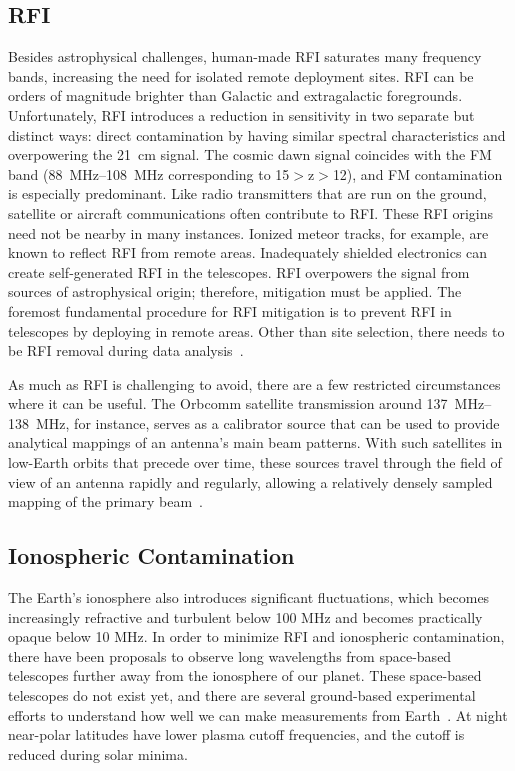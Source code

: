 \subsection*{RFI}

Besides astrophysical challenges, human-made RFI saturates many frequency bands, increasing the need for isolated remote deployment sites. RFI can be orders of magnitude brighter than Galactic and extragalactic foregrounds. Unfortunately, RFI introduces a reduction in sensitivity in two separate but distinct ways: direct contamination by having similar spectral characteristics and overpowering the \SI{21}{\centi \meter} signal. The cosmic dawn signal coincides with the FM band (\SIrange{88}{108}{\mega \hertz} corresponding to 15$>$z$>$12), and FM contamination is especially predominant. Like radio transmitters that are run on the ground, satellite or aircraft communications often contribute to RFI. These RFI origins need not be nearby in many instances. Ionized meteor tracks, for example, are known to reflect RFI from remote areas. Inadequately shielded electronics can create self-generated RFI in the telescopes. RFI overpowers the signal from sources of astrophysical origin; therefore, mitigation must be applied. The foremost fundamental procedure for RFI mitigation is to prevent RFI in telescopes by deploying in remote areas. Other than site selection, there needs to be RFI removal during data analysis~\citep{2020PASP..132f2001L}. 

As much as RFI is challenging to avoid, there are a few restricted circumstances where it can be useful. The Orbcomm satellite transmission around \SIrange{137}{138}{\mega \hertz}, for instance, serves as a calibrator source that can be used to provide analytical mappings of an antenna's main beam patterns. With such satellites in low-Earth orbits that precede over time, these sources travel through the field of view of an antenna rapidly and regularly,  allowing a relatively densely sampled mapping of the primary beam~\citep{2015RaSc...50..614N, 2018PASA...35...45L}. 

\subsection*{Ionospheric Contamination}

The Earth's ionosphere also introduces significant fluctuations, which becomes increasingly refractive and turbulent below 100 MHz and becomes practically opaque below 10 MHz. In order to minimize RFI and ionospheric contamination, there have been proposals to observe long wavelengths from space-based telescopes further away from the ionosphere of our planet. These space-based telescopes do not exist yet, and there are several ground-based experimental efforts to understand how well we can make measurements from Earth~\citep{2019arXiv190710853C, 2019arXiv190804296K}. At night near-polar latitudes have lower plasma cutoff frequencies, and the cutoff is reduced during solar minima.

